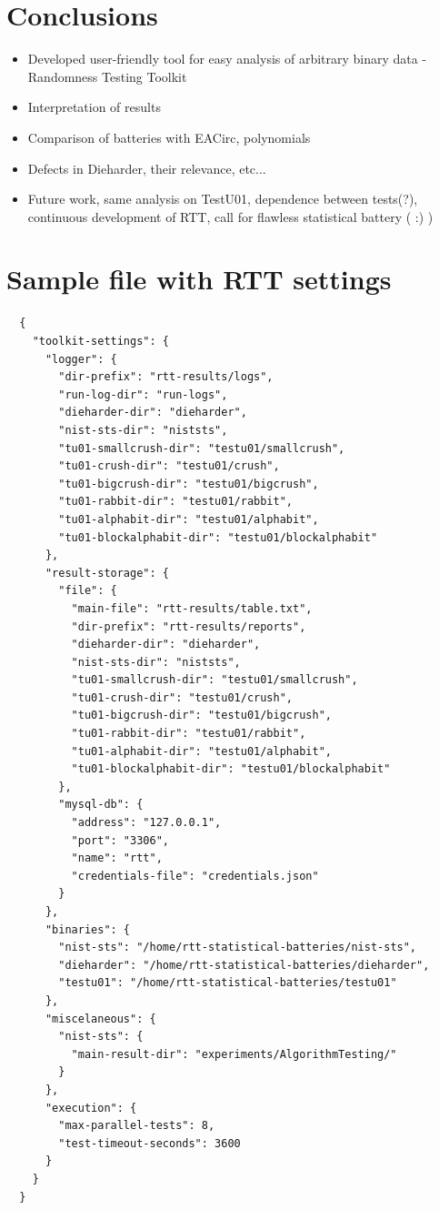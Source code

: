 \documentclass[
  digital,  	%
  color,		%
  oneside,   	%
  12pt,
  nocover,
  notable,
  nolof,
  nolot,
]{fithesis3}
\begin{document}
\chapter{Conclusions}
\begin{itemize}
\item Developed user-friendly tool for easy analysis of arbitrary binary data - Randomness Testing Toolkit
\item Interpretation of results
\item Comparison of batteries with EACirc, polynomials
\item Defects in Dieharder, their relevance, etc...
\item Future work, same analysis on TestU01, dependence between tests(?), continuous development of RTT, call for flawless statistical battery ( :) )
\end{itemize}

\appendix

\printbibliography

\chapter{Sample file with RTT settings}
\label{app:rtt_sett_json}
\begin{verbatim}
  {
    "toolkit-settings": {
      "logger": {
        "dir-prefix": "rtt-results/logs",
        "run-log-dir": "run-logs",
        "dieharder-dir": "dieharder",
        "nist-sts-dir": "niststs",
        "tu01-smallcrush-dir": "testu01/smallcrush",
        "tu01-crush-dir": "testu01/crush",
        "tu01-bigcrush-dir": "testu01/bigcrush",
        "tu01-rabbit-dir": "testu01/rabbit",
        "tu01-alphabit-dir": "testu01/alphabit",
        "tu01-blockalphabit-dir": "testu01/blockalphabit"
      },
      "result-storage": {
        "file": {
          "main-file": "rtt-results/table.txt",
          "dir-prefix": "rtt-results/reports",
          "dieharder-dir": "dieharder",
          "nist-sts-dir": "niststs",
          "tu01-smallcrush-dir": "testu01/smallcrush",
          "tu01-crush-dir": "testu01/crush",
          "tu01-bigcrush-dir": "testu01/bigcrush",
          "tu01-rabbit-dir": "testu01/rabbit",
          "tu01-alphabit-dir": "testu01/alphabit",
          "tu01-blockalphabit-dir": "testu01/blockalphabit"
        },
        "mysql-db": {
          "address": "127.0.0.1",
          "port": "3306",
          "name": "rtt",
          "credentials-file": "credentials.json"
        }
      },
      "binaries": {
        "nist-sts": "/home/rtt-statistical-batteries/nist-sts",
        "dieharder": "/home/rtt-statistical-batteries/dieharder",
        "testu01": "/home/rtt-statistical-batteries/testu01"
      },
      "miscelaneous": {
        "nist-sts": {
          "main-result-dir": "experiments/AlgorithmTesting/"
        }
      },
      "execution": {
        "max-parallel-tests": 8,
        "test-timeout-seconds": 3600
      }
    }
  }
\end{verbatim}
\end{document}
